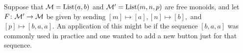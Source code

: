 \documentclass[CT4S-EN-RU]{subfiles}
\begin{document}
\begin{exerciseRUS}
\end{exerciseRUS}


\subsubsection{}

\begin{exampleENG}[Whiskering]\label{ex:whiskering}
Suppose that $\mathcal{M}=\textnormal{List}(a,b)$ and $\mathcal{M}'=\textnormal{List}(m,n,p)$ are free monoids, and let $F\colon\mathcal{M}'\rightarrow\mathcal{M}$ be given by sending $[m]\mapsto[a], [n]\mapsto[b],$ and $[p]\mapsto[b,a,a].$ An application of this might be if the sequence $[b,a,a]$ was commonly used in practice and one wanted to add a new button just for that sequence.


\end{exampleENG}
\end{document}
